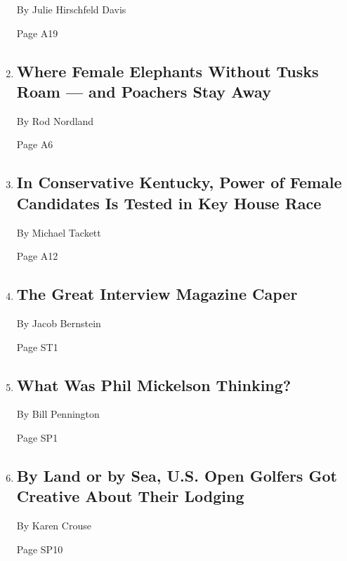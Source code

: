 \begin{enumerate}
  By Julie Hirschfeld Davis

  Page A19
\item
  \href{/2018/06/16/world/africa/south-africa-elephants-tusks.html}{}

  \hypertarget{where-female-elephants-without-tusks-roam--and-poachers-stay-away}{%
  \subsection{Where Female Elephants Without Tusks Roam --- and Poachers
  Stay
  Away}\label{where-female-elephants-without-tusks-roam--and-poachers-stay-away}}

  By Rod Nordland

  Page A6
\item
  \href{/2018/06/16/us/politics/kentucky-house-race-mcgrath.html}{}

  \hypertarget{in-conservative-kentucky-power-of-female-candidates-is-tested-in-key-house-race}{%
  \subsection{In Conservative Kentucky, Power of Female Candidates Is
  Tested in Key House
  Race}\label{in-conservative-kentucky-power-of-female-candidates-is-tested-in-key-house-race}}

  By Michael Tackett

  Page A12
\item
  \href{/2018/06/16/style/andy-warhol-interview.html}{}

  \hypertarget{the-great-interview-magazine-caper}{%
  \subsection{The Great Interview Magazine
  Caper}\label{the-great-interview-magazine-caper}}

  By Jacob Bernstein

  Page ST1
\item
  \href{/2018/06/16/sports/golf/phil-mickelson-ball-us-open.html}{}

  \hypertarget{what-was-phil-mickelson-thinking}{%
  \subsection{What Was Phil Mickelson
  Thinking?}\label{what-was-phil-mickelson-thinking}}

  By Bill Pennington

  Page SP1
\item
  \href{/2018/06/16/sports/-us-open-yacht-privacy.html}{}

  \hypertarget{by-land-or-by-sea-us-open-golfers-got-creative-about-their-lodging}{%
  \subsection{By Land or by Sea, U.S. Open Golfers Got Creative About
  Their
  Lodging}\label{by-land-or-by-sea-us-open-golfers-got-creative-about-their-lodging}}

  By Karen Crouse

  Page SP10
\end{enumerate}

